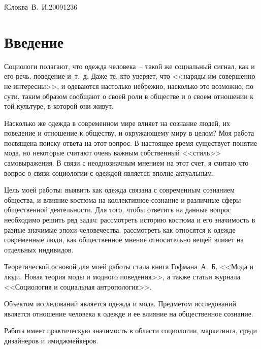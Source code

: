 


    {f}{Слоква~В.~И.}{20091236}
  \onehalfspacing
  \setcounter{page}{2}
  \tableofcontents

  \newpage

  \section*{Введение}
  
  Социологи полагают, что одежда человека~-- такой же социальный сигнал, как и
  его речь, поведение и~т.~д. Даже те, кто уверяет, что <<наряды им совершенно
  не интересны>>, и одеваются настолько небрежно, насколько это возможно, по
  сути, таким образом сообщают о своей роли в обществе и о своем отношении к
  той культуре, в которой они живут.
  
  Насколько же одежда в современном мире влияет на сознание людей, их поведение
  и отношение к обществу, и окружающему миру в целом? Моя работа посвящена
  поиску ответа на этот вопрос. В настоящее время существует понятие мода, но
  некоторые считают очень важным собственный <<стиль>> самовыражения. В связи
  с неоднозначным мнением на этот счет, я считаю что вопрос о связи социологии
  с одеждой является вполне актуальным.
  
  Цель моей работы: выявить как одежда связана с современным сознанием общества,
  и влияние костюма на коллективное сознание и различные сферы общественной
  деятельности. Для того, чтобы ответить на данные вопрос необходимо решить ряд
  задач: рассмотреть историю костюма и его значимость в разные значимые эпохи
  человечества, рассмотреть как относятся к одежде современные люди, как
  общественное мнение относительно вещей влияет на отдельных индивидов.
  
  Теоретической основой для моей работы стала книга Гофмана~А.~Б. <<Мода и
  люди. Новая теория моды и модного поведения>>, а также статьи журнала
  <<Социология и социальная антропология>>.
  
  Объектом исследований является одежда и мода. Предметом исследований является
  отношение человека к одежде и ее влияние на общественное сознание.
  
  Работа имеет практическую значимость в области социологии, маркетинга, среди
  дизайнеров и имиджмейкеров.
  
